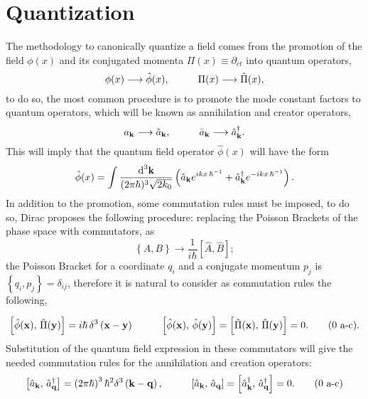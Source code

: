 \section*{Quantization}
The methodology to canonically quantize a field comes from the promotion of the field $\phi(x)$ and its conjugated momenta $\Pi(x)\equiv\partial_{ct}$ into quantum operators,
\begin{equation*}
	\phi(x)\longrightarrow\hat{\phi}(x),\hspace{1.0cm}\Pi(x)\longrightarrow\hat{\Pi}(x),
\end{equation*}
to do so, the most common procedure is to promote the mode constant factors to quantum operators, which will be known as annihilation and creator operators, 
\begin{equation*}
	a_\mathbf{k}\longrightarrow\hat{a}_\mathbf{k},\hspace{1.0cm}\bar a_\mathbf{k}\longrightarrow\hat{a}_\mathbf{k}^\dagger.
\end{equation*}
This will imply that the quantum field operator $\hat{\phi}(x)$ will have the form
\begin{equation}
	\hat\phi(x)=\int\frac{\text{d}^3\mathbf{k}}{(2\pi\hbar)^3\sqrt{2k_0}}\left(\hat a_\mathbf{k}e^{ikx\,\hbar^{-1}}+ \hat a_\mathbf{k}^\dagger e^{-ikx\,\hbar^{-1}}\right).
\end{equation}
In addition to the promotion, some commutation rules must be imposed, to do so, Dirac proposes the following procedure: replacing the Poisson Brackets of the phase space with commutators, as
\begin{equation}
	\left\{A,B\right\}\to\frac{1}{i\hbar}\left[\hat{A},\hat{B}\right];
\end{equation}
the Poisson Bracket for a coordinate $q_i$ and a conjugate momentum $p_j$ is $\left\{q_i,p_j\right\}=\delta_{ij}$, therefore it is natural to consider as commutation rules the following,


\begin{subequations}
	\begin{gather}
		\left[\hat{\phi}(\mathbf{x}),\,\hat{\Pi}(\mathbf{y})\right]=i\hbar \,\delta^3\left(\mathbf{x}-\mathbf{y}\right)\hspace{1.0cm}\left[\hat{\phi}(\mathbf{x}),\,\hat{\phi}(\mathbf{y})\right]=\left[\hat{\Pi}(\mathbf{x}),\,\hat{\Pi}(\mathbf{y})\right]=0.\tag{\theequation \,\,a-c}.
	\end{gather}
\end{subequations}
Substitution of the quantum field expression in these commutators will give the needed commutation rules for the annihilation and creation operators:
\begin{subequations}\label{eq: general a operator commutator rules}
	\begin{gather}
		\left[\hat{a}_\mathbf{k},\,\hat{a}_\mathbf{q}^\dagger\right]=\left(2\pi\hbar\right)^3\hbar^2 \delta^3\left(\mathbf{k}-\mathbf{q}\right),\hspace{1.0cm}\left[\hat{a}_\mathbf{k},\,\hat{a}_\mathbf{q}\right]=\left[\hat{a}_\mathbf{k}^\dagger,\,\hat{a}_\mathbf{q}^\dagger\right]=0.\tag{\theequation \,\,a-c}
	\end{gather}
\end{subequations}
